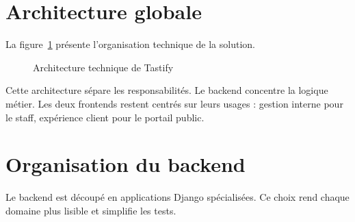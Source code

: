 \section{Architecture globale}
La figure~\ref{fig:architecture-technique} présente l'organisation technique de la solution.

\begin{figure}[H]
\centering
{}
\caption{Architecture technique de Tastify}
\label{fig:architecture-technique}
\end{figure}

Cette architecture sépare les responsabilités. Le backend concentre la logique métier. Les deux frontends restent centrés sur leurs usages : gestion interne pour le staff, expérience client pour le portail public.

\section{Organisation du backend}
Le backend est découpé en applications Django spécialisées. Ce choix rend chaque domaine plus lisible et simplifie les tests.

